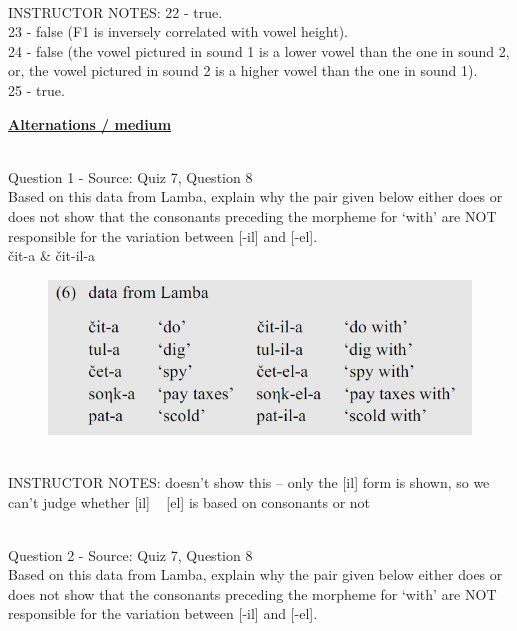 \documentclass[12pt]{article}
\begin{document}
~\\
INSTRUCTOR NOTES: 22 - true. \\23 - false (F1 is inversely correlated with vowel height). \\24 - false (the vowel pictured in sound 1 is a lower vowel than the one in sound 2, or, the vowel pictured in sound 2 is a higher vowel than the one in sound 1).\\25 - true.


\newpage\textbf{\underline{\huge Alternations / medium\\}}

~\\

{\large Question 1} - Source: Quiz 7, Question 8\\

Based on this data from Lamba, explain why the pair given below either does or does not show that the consonants preceding the morpheme for `with' are NOT responsible for the variation between [-il] and [-el].\\

čit-a \& čit-il-a

\begin{figure}[H]
\includegraphics{../images/peng119_lamba.png}
\end{figure}

~\\
INSTRUCTOR NOTES: doesn't show this -- only the [il] form is shown, so we can't judge whether [il] ~ [el] is based on consonants or not


~\\

{\large Question 2} - Source: Quiz 7, Question 8\\

Based on this data from Lamba, explain why the pair given below either does or does not show that the consonants preceding the morpheme for `with' are NOT responsible for the variation between [-il] and [-el].\\
\end{document}
